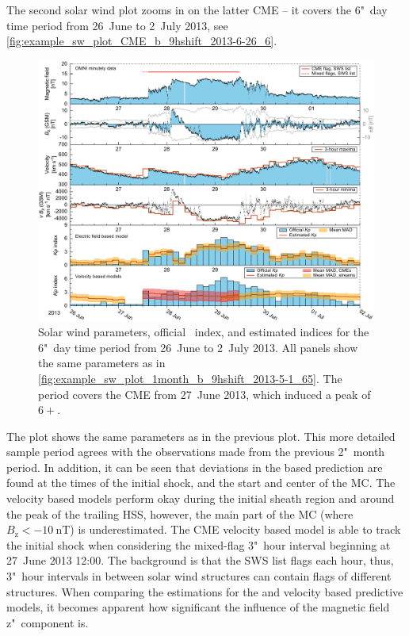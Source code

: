 The second solar wind plot zooms in on the latter CME -- it covers the 6"~day time period from 26~June to 2~July 2013, see \autoref{fig:example_sw_plot_CME_b_9hshift_2013-6-26_6}.
\begin{figure}[htb]
	\centering
	\includegraphics[width=\textwidth]{figures_of_mine/chapter2/example_sw_plot_CME_b_9hshift_2013-6-26_6.pdf}
	\caption[I created the figure myself.]
	{Solar wind parameters, official \Kp~index, and estimated \Kp{} indices for the 6"~day time period from 26~June to 2~July 2013. All panels show the same parameters as in \autoref{fig:example_sw_plot_1month_b_9hshift_2013-5-1_65}. The period covers the CME from 27~June 2013, which induced a peak \Kp{} of $6+$.}
	\label{fig:example_sw_plot_CME_b_9hshift_2013-6-26_6}
\end{figure}
The plot shows the same parameters as in the previous plot. This more detailed sample period agrees with the observations made from the previous 2"~month period. In addition, it can be seen that deviations in the \vBz{} based \Kp{} prediction are found at the times of the initial shock, and the start and center of the MC. The velocity based models perform okay during the initial sheath region and around the peak of the trailing HSS, however, the main part of the MC (where $B_\text{z} < \SI{-10}{\nano\tesla}$) is underestimated. The CME velocity based model is able to track the initial shock when considering the mixed-flag 3"~hour interval beginning at 27~June 2013 12:00. The background is that the SWS list flags each hour, thus, 3"~hour intervals in between solar wind structures can contain flags of different structures.
When comparing the \Kp{} estimations for the \vBz{} and velocity based predictive models, it becomes apparent how significant the influence of the magnetic field z"~component is.


